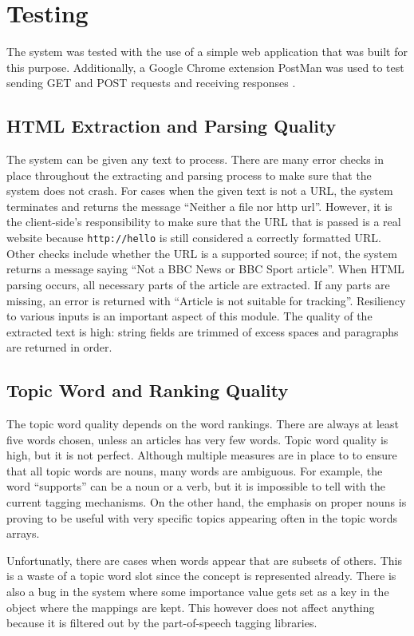 \documentclass[11pt,titlepage]{report}
\begin{document}
\section{Testing}
The system was tested with the use of a simple web application that was built for this purpose. Additionally, a Google Chrome extension PostMan was used to test sending GET and POST requests and receiving responses \cite{postman}.
\subsection{HTML Extraction and Parsing Quality}
The system can be given any text to process. There are many error checks in place throughout the extracting and parsing process to make sure that the system does not crash. For cases when the given text is not a URL, the system terminates and returns the message ``Neither a file nor http url''. However, it is the client-side's responsibility to make sure that the URL that is passed is a real website because \lstinline|http://hello| is still considered a correctly formatted URL. Other checks include whether the URL is a supported source; if not, the system returns a message saying ``Not a BBC News or BBC Sport article''. When HTML parsing occurs, all necessary parts of the article are extracted. If any parts are missing, an error is returned with ``Article is not suitable for tracking''. Resiliency to various inputs is an important aspect of this module. The quality of the extracted text is high: string fields are trimmed of excess spaces and paragraphs are returned in order.
\subsection{Topic Word and Ranking Quality}
The topic word quality depends on the word rankings. There are always at least five words chosen, unless an articles has very few words. Topic word quality is high, but it is not perfect. Although multiple measures are in place to to ensure that all topic words are nouns, many words are ambiguous. For example, the word ``supports'' can be a noun or a verb, but it is impossible to tell with the current tagging mechanisms. On the other hand, the emphasis on proper nouns is proving to be useful with very specific topics appearing often in the topic words arrays.

Unfortunatly, there are cases when words appear that are subsets of others. This is a waste of a topic word slot since the concept is represented already. There is also a bug in the system where some importance value gets set as a key in the object where the mappings are kept. This however does not affect anything because it is filtered out by the part-of-speech tagging libraries.
\end{document}
